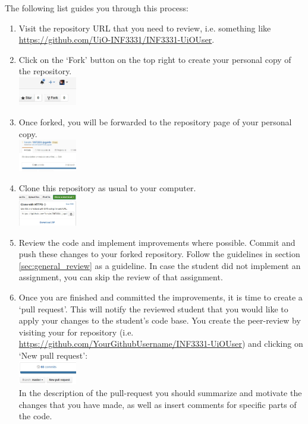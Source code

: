 \documentclass[a4paper]{article}
\begin{document}
The following list guides you through this process:
\begin{enumerate}
\item Visit the repository URL that you need to review, i.e. something like \\ \url{https://github.com/UiO-INF3331/INF3331-UiOUser}.
\item Click on the `Fork' button on the top right to create your personal copy of the repository. 
\\
\includegraphics[width=0.2\textwidth]{Selection_001}
\item Once forked, you will be forwarded to the repository page of your personal copy.
\\
\includegraphics[width=0.2\textwidth]{Selection_003}
\item Clone this repository as usual to your computer.
\\
\includegraphics[width=0.2\textwidth]{Selection_005}
\item Review the code and implement improvements where possible. Commit and push these changes to your forked repository. Follow the guidelines in section \ref{sec:general_review} as a guideline. In case the student did not implement an assignment, you can skip the review of that assignment. 
\\
\item Once you are finished and committed the improvements, it is time to create a `pull request'. This will notify the reviewed student that you would like to apply your changes to the student's code base. You create the peer-review by visiting your for repository (i.e. \url{https://github.com/YourGithubUsername/INF3331-UiOUser}) and clicking on `New pull request':
\\
\includegraphics[width=0.2\textwidth]{Selection_006}
\\
In the description of the pull-request you should summarize and motivate the changes that you have made, as well as insert comments for specific parts of the code.
\end{enumerate}
\end{document}
